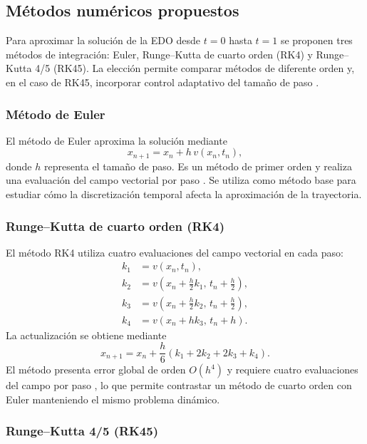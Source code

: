 \documentclass[final,5p,times,twocolumn,authoryear]{elsarticle}
\begin{document}
\subsection{Métodos numéricos propuestos}

Para aproximar la solución de la EDO desde $t=0$ hasta $t=1$ se proponen tres métodos de integración: Euler, Runge--Kutta de cuarto orden (RK4) y Runge--Kutta 4/5 (RK45). La elección permite comparar métodos de diferente orden y, en el caso de RK45, incorporar control adaptativo del tamaño de paso \citep{xiao2026solvers}.

\subsubsection{Método de Euler}

El método de Euler aproxima la solución mediante
\begin{equation}
    x_{n+1}=x_n+h\,v(x_n,t_n),
\end{equation}
\noindent donde $h$ representa el tamaño de paso. Es un método de primer orden y realiza una evaluación del campo vectorial por paso \citep{xiao2026solvers}. Se utiliza como método base para estudiar cómo la discretización temporal afecta la aproximación de la trayectoria.

\subsubsection{Runge--Kutta de cuarto orden (RK4)}

El método RK4 utiliza cuatro evaluaciones del campo vectorial en cada paso:
\begin{align}
 k_1 &= v(x_n,t_n),\\
 k_2 &= v\left(x_n+\frac{h}{2}k_1,\,t_n+\frac{h}{2}\right),\\
 k_3 &= v\left(x_n+\frac{h}{2}k_2,\,t_n+\frac{h}{2}\right),\\
 k_4 &= v(x_n+h k_3,\,t_n+h).
\end{align}
\noindent La actualización se obtiene mediante
\begin{equation}
 x_{n+1}=x_n+\frac{h}{6}(k_1+2k_2+2k_3+k_4).
\end{equation}
\noindent El método presenta error global de orden $O(h^4)$ y requiere cuatro evaluaciones del campo por paso \citep{xiao2026solvers}, lo que permite contrastar un método de cuarto orden con Euler manteniendo el mismo problema dinámico.

\subsubsection{Runge--Kutta 4/5 (RK45)}
\end{document}

